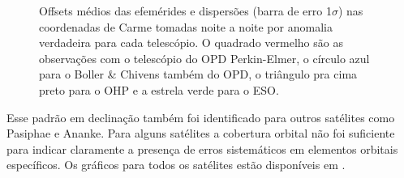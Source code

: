 \documentclass[12pt,a4paper]{monografia}
\begin{document}
\begin{figure}[h]
\begin{centering}
\caption{Offsets médios das efemérides e dispersões (barra de erro 1$\sigma$) nas coordenadas de Carme tomadas noite a noite por anomalia verdadeira para cada telescópio. O quadrado vermelho são as observações com o telescópio do OPD Perkin-Elmer, o círculo azul para o Boller \& Chivens também do OPD, o triângulo pra cima preto para o OHP e a estrela verde para o ESO.}
\label{Fig: carme_anom}
\end{centering}
\end{figure}

Esse padrão em declinação também foi identificado para outros satélites como Pasiphae e Ananke. Para alguns satélites a cobertura orbital não foi suficiente para indicar claramente a presença de erros sistemáticos em elementos orbitais específicos. Os gráficos para todos os satélites estão disponíveis em \cite{GomesJunior2015-Irregular}.
\end{document}
